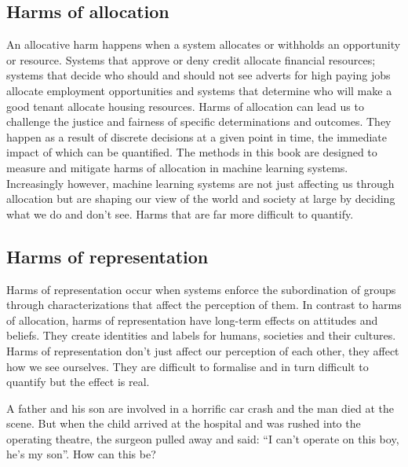 \subsection{Harms of allocation}

An allocative harm happens when a system allocates or withholds an opportunity or resource. Systems that approve or deny credit allocate financial resources; systems that decide who should and should not see adverts for high paying jobs allocate employment opportunities and systems that determine who will make a good tenant allocate housing resources. Harms of allocation can lead us to challenge the justice and fairness of specific determinations and outcomes. They happen as a result of discrete decisions at a given point in time, the immediate impact of which can be quantified. The methods in this book are designed to measure and mitigate harms of allocation in machine learning systems. Increasingly however, machine learning systems are not just affecting us through allocation but are shaping our view of the world and society at large by deciding what we do and don't see. Harms that are far more difficult to quantify.

\subsection{Harms of representation}

Harms of representation occur when systems enforce the subordination of groups through characterizations that affect the perception of them. In contrast to harms of allocation, harms of representation have long-term effects on attitudes and beliefs. They create identities and labels for humans, societies and their cultures. Harms of representation don't just affect our perception of each other, they affect how we see ourselves. They are difficult to formalise and in turn difficult to quantify but the effect is real.

\begin{lookbox}
A father and his son are involved in a horrific car crash and the man died at the scene. But when the child arrived at the hospital and was rushed into the operating theatre, the surgeon pulled away and said: ``I can’t operate on this boy, he’s my son''. How can this be?
\end{lookbox}


